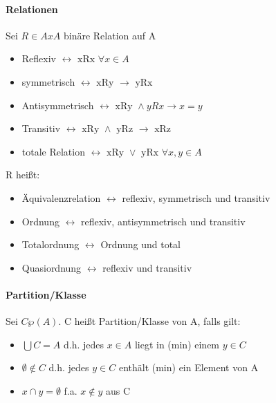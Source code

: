 \documentclass[10pt,landscape]{article}
\begin{document}
\raggedright
\footnotesize
\begin{multicols}{3}


\setlength{\premulticols}{1pt}
\setlength{\postmulticols}{1pt}
\setlength{\multicolsep}{1pt}
\setlength{\columnsep}{2pt}

\paragraph{Relationen}
Sei $R\in AxA$ binäre Relation auf A
\begin{itemize}
    \item Reflexiv $\leftrightarrow \text{ xRx } \forall x \in A$
    \item symmetrisch $\leftrightarrow \text{ xRy } \rightarrow \text{ yRx }$
    \item Antisymmetrisch $\leftrightarrow \text{ xRy } \wedge yRx \rightarrow x=y$
    \item Transitiv $\leftrightarrow \text{ xRy } \wedge \text{ yRz } \rightarrow \text{ xRz }$
    \item totale Relation $\leftrightarrow \text{ xRy } \vee \text{ yRx }  \forall x,y \in A$
\end{itemize}
R heißt:
\begin{itemize}
    \item Äquivalenzrelation $\leftrightarrow$ reflexiv, symmetrisch und transitiv
    \item Ordnung $\leftrightarrow$ reflexiv, antisymmetrisch und transitiv
    \item Totalordnung $\leftrightarrow$ Ordnung und total
    \item Quasiordnung $\leftrightarrow$ reflexiv und transitiv
\end{itemize}

\paragraph{Partition/Klasse}
Sei $C\wp (A)$. C heißt Partition/Klasse von A, falls gilt:
\begin{itemize}
    \item $\bigcup C=A$ d.h. jedes $x\in A$ liegt in (min) einem $y\in C$
    \item $\emptyset \not \in C$ d.h. jedes $y\in C$ enthält (min) ein Element von A
    \item $x \cap y = \emptyset$ f.a. $x\not \in y$ aus C
\end{itemize}


\end{multicols}
\end{document}
